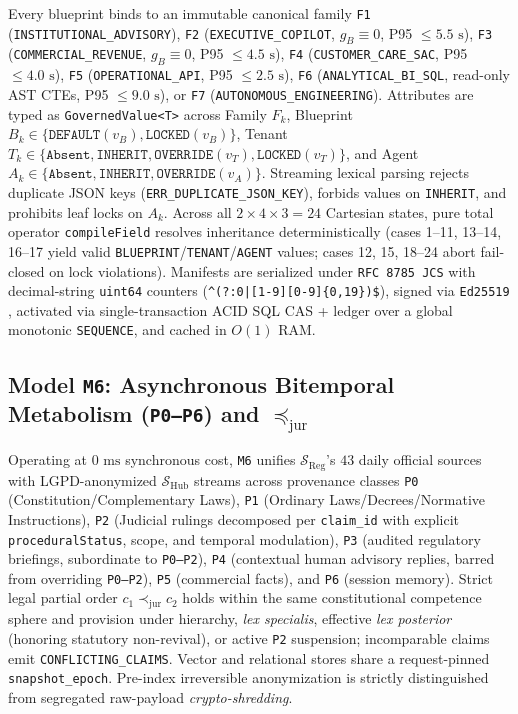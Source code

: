\documentclass[10pt,twocolumn]{article}
\begin{document}
Every blueprint binds to an immutable canonical family \texttt{F1} (\texttt{INSTITUTIONAL\_ADVISORY}), \texttt{F2} (\texttt{EXECUTIVE\_COPILOT}, $g_B\equiv 0$, P95 $\le 5.5\text{ s}$), \texttt{F3} (\texttt{COMMERCIAL\_REVENUE}, $g_B\equiv 0$, P95 $\le 4.5\text{ s}$), \texttt{F4} (\texttt{CUSTOMER\_CARE\_SAC}, P95 $\le 4.0\text{ s}$), \texttt{F5} (\texttt{OPERATIONAL\_API}, P95 $\le 2.5\text{ s}$), \texttt{F6} (\texttt{ANALYTICAL\_BI\_SQL}, read-only AST CTEs, P95 $\le 9.0\text{ s}$), or \texttt{F7} (\texttt{AUTONOMOUS\_ENGINEERING}). Attributes are typed as \texttt{GovernedValue<T>} across Family $F_k$, Blueprint $B_k \in \{\texttt{DEFAULT}(v_B),\texttt{LOCKED}(v_B)\}$, Tenant $T_k \in \{\texttt{Absent},\texttt{INHERIT},\texttt{OVERRIDE}(v_T),\texttt{LOCKED}(v_T)\}$, and Agent $A_k \in \{\texttt{Absent},\texttt{INHERIT},\texttt{OVERRIDE}(v_A)\}$. Streaming lexical parsing rejects duplicate JSON keys (\texttt{ERR\_DUPLICATE\_JSON\_KEY}), forbids values on \texttt{INHERIT}, and prohibits leaf locks on $A_k$. Across all $2\times 4\times 3 = 24$ Cartesian states, pure total operator \texttt{compileField} resolves inheritance deterministically (cases 1--11, 13--14, 16--17 yield valid \texttt{BLUEPRINT}/\texttt{TENANT}/\texttt{AGENT} values; cases 12, 15, 18--24 abort fail-closed on lock violations). Manifests are serialized under \texttt{RFC 8785 JCS} \cite{rundgren2020jcs} with decimal-string \texttt{uint64} counters (\texttt{\^{}(?:0|[1-9][0-9]\{0,19\})\$}), signed via \texttt{Ed25519} \cite{josefsson2017eddsa}, activated via single-transaction ACID SQL CAS + ledger over a global monotonic \texttt{SEQUENCE}, and cached in $O(1)$ RAM.

\subsection{Model \texttt{M6}: Asynchronous Bitemporal Metabolism (\texttt{P0--P6}) and $\preceq_{\mathrm{jur}}$}

Operating at $0\text{ ms}$ synchronous cost, \texttt{M6} unifies $\mathcal{S}_{\mathrm{Reg}}$'s $43$ daily official sources with LGPD-anonymized $\mathcal{S}_{\mathrm{Hub}}$ streams across provenance classes \texttt{P0} (Constitution/Complementary Laws), \texttt{P1} (Ordinary Laws/Decrees/Normative Instructions), \texttt{P2} (Judicial rulings decomposed per \texttt{claim\_id} with explicit \texttt{proceduralStatus}, scope, and temporal modulation), \texttt{P3} (audited regulatory briefings, subordinate to \texttt{P0--P2}), \texttt{P4} (contextual human advisory replies, barred from overriding \texttt{P0--P2}), \texttt{P5} (commercial facts), and \texttt{P6} (session memory). Strict legal partial order $c_1 \prec_{\mathrm{jur}} c_2$ holds within the same constitutional competence sphere and provision under hierarchy, \emph{lex specialis}, effective \emph{lex posterior} (honoring statutory non-revival), or active \texttt{P2} suspension; incomparable claims emit \texttt{CONFLICTING\_CLAIMS}. Vector and relational stores share a request-pinned \texttt{snapshot\_epoch}. Pre-index irreversible anonymization is strictly distinguished from segregated raw-payload \emph{crypto-shredding}.
\end{document}
